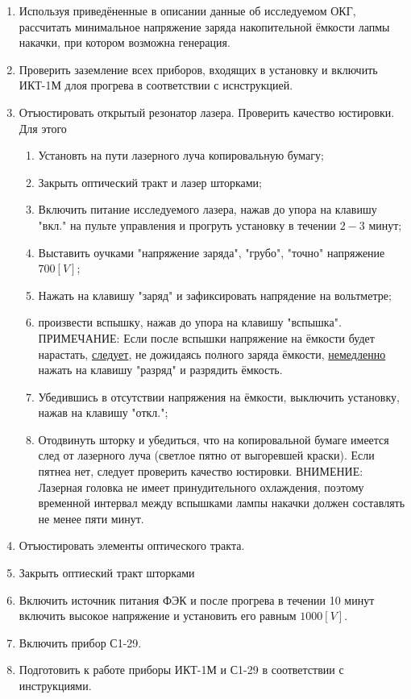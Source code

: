 \documentclass[a4paper,14pt,russian]{article}
\begin{document}
\begin{enumerate}
\item Используя приведёненные в описании данные об исследуемом ОКГ, рассчитать минимальное напряжение заряда накопительной ёмкости лапмы накачки, при котором возможна генерация.
\item Проверить заземление всех приборов, входящих в установку и включить ИКТ-1М длоя прогрева в соответствии с иснструкцией.
\item Отъюстировать открытый резонатор лазера. Проверить качество юстировки. Для этого
\begin{enumerate}
\item Установть на пути лазерного луча копировальную бумагу;
\item Закрыть оптический тракт и лазер шторками;
\item Включить питание исследуемого лазера, нажав до упора на клавишу "вкл." на пульте управления и прогруть установку в течении $2 - 3$ минут;
\item Выставить оучками "напряжение заряда", "грубо", "точно" напряжение $700 [V]$;
\item Нажать на клавишу "заряд" и зафиксировать напрядение на вольтметре;
\item произвести вспышку, нажав до упора на клавишу "вспышка". ПРИМЕЧАНИЕ: Если после вспышки напряжение на ёмкости будет нарастать, \underline{следует}, не дожидаясь полного заряда ёмкости, \underline{немедленно} нажать на клавишу "разряд" и разрядить ёмкость.
\item Убедившись в отсутствии напряжения на ёмкости, выключить установку, нажав на клавишу "откл.";
\item Отодвинуть шторку и убедиться, что на копировальной бумаге имеется след от лазерного луча (светлое пятно от выгоревшей краски). Если пятнеа нет, следует проверить качество юстировки. ВНИМЕНИЕ: Лазерная головка не имеет принудительного охлаждения, поэтому временной интервал между вспышками лампы накачки должен составлять не менее пяти минут.
\end{enumerate}
\item Отъюстировать элементы оптического тракта.
\item Закрыть оптиеский тракт шторками
\item Включить источник питания ФЭК и после прогрева в течении 10 минут включить высокое напряжение и установить его равным $1000 [V]$.
\item Включить прибор С1-29.
\item Подготовить к работе приборы ИКТ-1М и С1-29 в соответствии с инструкциями.

\end{enumerate}
\end{document}
